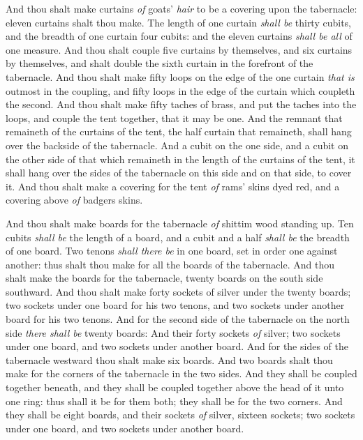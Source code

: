 \documentclass[11pt,letterpaper,oneside]{memoir}
\begin{document}
And thou shalt make curtains \emph{of} goats' \emph{hair} to be a
covering upon the tabernacle: eleven curtains shalt thou make. The
length of one curtain \emph{shall be} thirty cubits, and the breadth of
one curtain four cubits: and the eleven curtains \emph{shall be all} of
one measure. And thou shalt couple five curtains by themselves, and six
curtains by themselves, and shalt double the sixth curtain in the
forefront of the tabernacle. And thou shalt make fifty loops on the edge
of the one curtain \emph{that is} outmost in the coupling, and fifty
loops in the edge of the curtain which coupleth the second. And thou
shalt make fifty taches of brass, and put the taches into the loops, and
couple the tent together, that it may be one. And the remnant that
remaineth of the curtains of the tent, the half curtain that remaineth,
shall hang over the backside of the tabernacle. And a cubit on the one
side, and a cubit on the other side of that which remaineth in the
length of the curtains of the tent, it shall hang over the sides of the
tabernacle on this side and on that side, to cover it. And thou shalt
make a covering for the tent \emph{of} rams' skins dyed red, and a
covering above \emph{of} badgers skins.

And thou shalt make boards for the tabernacle \emph{of} shittim wood
standing up. Ten cubits \emph{shall be} the length of a board, and a
cubit and a half \emph{shall be} the breadth of one board. Two tenons
\emph{shall there be} in one board, set in order one against another:
thus shalt thou make for all the boards of the tabernacle. And thou
shalt make the boards for the tabernacle, twenty boards on the south
side southward. And thou shalt make forty sockets of silver under the
twenty boards; two sockets under one board for his two tenons, and two
sockets under another board for his two tenons. And for the second side
of the tabernacle on the north side \emph{there shall be} twenty boards: And
their forty sockets \emph{of} silver; two sockets under one board, and
two sockets under another board. And for the sides of the tabernacle
westward thou shalt make six boards. And two boards shalt thou make for
the corners of the tabernacle in the two sides. And they shall be
coupled together beneath, and they shall be coupled together above the
head of it unto one ring: thus shall it be for them both; they shall be
for the two corners. And they shall be eight boards, and their sockets
\emph{of} silver, sixteen sockets; two sockets under one board, and two
sockets under another board.
\end{document}
